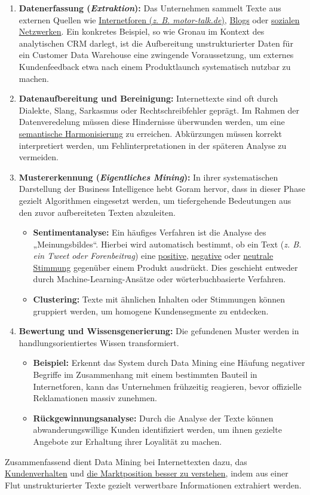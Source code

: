 \begin{enumerate}[label=\arabic*.), leftmargin=*]
    \item \textbf{Datenerfassung (\textit{Extraktion}):} Das Unternehmen sammelt Texte aus externen Quellen wie \uline{Internetforen (\textit{\acs{z. B.} motor-talk.de})}, \uline{Blogs} oder \uline{sozialen Netzwerken}. Ein konkretes Beispiel, so wie Gronau \cite[124]{19} im Kontext des analytischen \acs{CRM} darlegt, ist die Aufbereitung unstrukturierter Daten für ein Customer Data Warehouse eine zwingende Voraussetzung, um externes Kundenfeedback etwa nach einem Produktlaunch systematisch nutzbar zu machen.
    \item \textbf{Datenaufbereitung und Bereinigung:} Internettexte sind oft durch Dialekte, Slang, Sarkasmus oder Rechtschreibfehler geprägt. Im Rahmen der Datenveredelung müssen diese Hindernisse überwunden werden, um eine \uline{semantische Harmonisierung} zu erreichen. Abkürzungen müssen korrekt interpretiert werden, um Fehlinterpretationen in der späteren Analyse zu vermeiden.
    \item \textbf{Mustererkennung (\textit{Eigentliches Mining}):} In ihrer systematischen Darstellung der Business Intelligence hebt Goram \cite[48]{20} hervor, dass in dieser Phase gezielt Algorithmen eingesetzt werden, um tiefergehende Bedeutungen aus den zuvor aufbereiteten Texten abzuleiten.
    \begin{itemize}
        \item \textbf{Sentimentanalyse:} Ein häufiges Verfahren ist die Analyse des „Meinungsbildes“. Hierbei wird automatisch bestimmt, ob ein Text (\textit{\acs{z. B.} ein Tweet oder Forenbeitrag}) eine \uline{positive}, \uline{negative} oder \uline{neutrale Stimmung} gegenüber einem Produkt ausdrückt. Dies geschieht entweder durch Machine-Learning-Ansätze oder wörterbuchbasierte Verfahren.
        \item \textbf{Clustering:} Texte mit ähnlichen Inhalten oder Stimmungen können gruppiert werden, um homogene Kundensegmente zu entdecken.
    \end{itemize}
    \item \textbf{Bewertung und Wissensgenerierung:} Die gefundenen Muster werden in handlungsorientiertes Wissen transformiert.
    \begin{itemize}
        \item \textbf{Beispiel:} Erkennt das System durch Data Mining eine Häufung negativer Begriffe im Zusammenhang mit einem bestimmten Bauteil in Internetforen, kann das Unternehmen frühzeitig reagieren, bevor offizielle Reklamationen massiv zunehmen.
        \item \textbf{Rückgewinnungsanalyse:} Durch die Analyse der Texte können abwanderungswillige Kunden identifiziert werden, um ihnen gezielte Angebote zur Erhaltung ihrer Loyalität zu machen.
    \end{itemize}
\end{enumerate}
Zusammenfassend dient Data Mining bei Internettexten dazu, das \uline{Kundenverhalten} und \uline{die Marktposition besser zu verstehen}, indem aus einer Flut unstrukturierter Texte gezielt verwertbare Informationen extrahiert werden.

